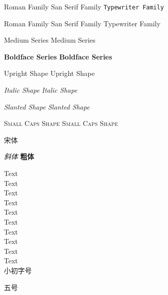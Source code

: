 \documentclass[11pt]{article}
\begin{document}
	
	\textrm{Roman Family} \textsf{San Serif Family} \texttt{Typewriter Family}
	
	  
	
	{\rmfamily Roman Family} {\sffamily San Serif Family} {\ttfamily Typewriter Family}
	
	\textmd{Medium Series} %
	\mdseries Medium Series
	
	\textbf{Boldface Series} %
	{\bfseries Boldface Series}
	
	
	\textup{Upright Shape} \upshape Upright Shape
	
	\textit{Italic Shape} \itshape Italic Shape
	
	\textsl{Slanted Shape} \slshape Slanted Shape
	
	\textsc{Small Caps Shape} \scshape Small Caps Shape
	
	{\songti 宋体}   
	
	\textit{斜体} \textbf{粗体}
	
	{\tiny Text} \\ %
	{\scriptsize Text} \\
	{\footnotesize Text} \\
	{\small Text} \\
	{\normalsize Text} \\
	{\large Text} \\
	{\Large Text} \\
	{\LARGE Text} \\
	{\huge Text} \\
	{\Huge Text} \\
	
	 小初字号 %
	
	 五号
	
\end{document}

